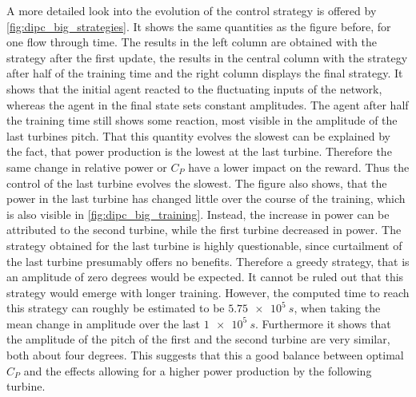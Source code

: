 A more detailed look into the evolution of the control strategy is offered by \autoref{fig:dipc_big_strategies}. It shows the same quantities as the figure before, for one flow through time. The results in the left column are obtained with the strategy after the first update, the results in the central column with the strategy after half of the training time and the right column displays the final strategy. It shows that the initial agent reacted to the fluctuating inputs of the network, whereas the agent in the final state sets constant amplitudes. The agent after half the training time still shows some reaction, most visible in the amplitude of the last turbines pitch. That this quantity evolves the slowest can be explained by the fact, that power production is the lowest at the last turbine. Therefore the same change in relative power or $C_P$ have a lower impact on the reward. Thus the control of the last turbine evolves the slowest. The figure also shows, that the power in the last turbine has changed little over the course of the training, which is also visible in \autoref{fig:dipc_big_training}. Instead, the increase in power can be attributed to the second turbine, while the first turbine decreased in power. The strategy obtained for the last turbine is highly questionable, since curtailment of the last turbine presumably offers no benefits. Therefore a greedy strategy, that is an amplitude of zero degrees would be expected. It cannot be ruled out that this strategy would emerge with longer training. However, the computed time to reach this strategy can roughly be estimated to be $\SI{5.75e5}{s}$, when taking the mean change in amplitude over the last $\SI{1e5}{s}$. Furthermore it shows that the amplitude of the pitch of the first and the second turbine are very similar, both about four degrees. This suggests that this a good balance between optimal $C_P$ and the effects allowing for a higher power production by the following turbine.
